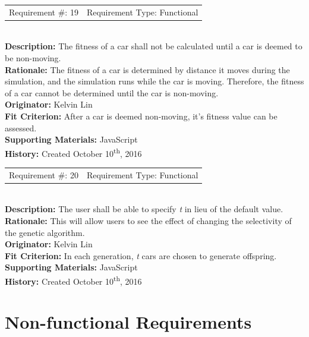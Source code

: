\documentclass[12pt, titlepage]{article}
\begin{document}
\begin{reqbox}
	\begin{tabular}{cc}
		Requirement \#: 19 & Requirement Type: Functional \\
	\end{tabular} \\
	\textbf{Description:} The fitness of a car shall not be calculated until a car 
	is deemed to be non-moving. \\
	\textbf{Rationale:} The fitness of a car is determined by distance it moves 
	during the simulation, and the simulation runs while the car is moving. 
	Therefore, the fitness of a car cannot be determined until the car is 
	non-moving. \\
	\textbf{Originator:} Kelvin Lin\\
	\textbf{Fit Criterion:} After a car is deemed non-moving, it's fitness value 
can 
	be assessed.\\
	\textbf{Supporting Materials:} JavaScript \\
	\textbf{History:} Created October 10\textsuperscript{th}, 2016
\end{reqbox}


\begin{reqbox}
	\begin{tabular}{cc}
		Requirement \#: 20 & Requirement Type: Functional \\
	\end{tabular} \\
	\textbf{Description:} The user shall be able to specify \textit{t} in lieu of 
	the default value. \\
	\textbf{Rationale:} This will allow users to see the effect of changing the 
	selectivity of the genetic algorithm. \\
	\textbf{Originator:} Kelvin Lin\\
	\textbf{Fit Criterion:} In each generation, \textit{t} cars are chosen to 
	generate offspring. \\
	\textbf{Supporting Materials:} JavaScript \\
	\textbf{History:} Created October 10\textsuperscript{th}, 2016
\end{reqbox}

\newpage

\section{Non-functional Requirements}
\end{document}
